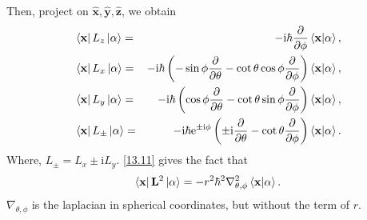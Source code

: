 \documentclass{article}
\theoremstyle{1}
\newcommand{\pa}{\partial}
\newcommand{\ii}{\mathrm{i}}
\newcommand{\ee}{\mathrm{e}}
\begin{document}
Then, project on $\hat{\mathbf{x}},\hat{\mathbf{y}},\hat{\mathbf{z}}$, we obtain
\begin{eqnarray}
    &\bra{\mathbf{x}}L_z\ket{\alpha}=&-\ii \hbar \pdv{\phi}\braket{\mathbf{x}}{\alpha},\\
    &\bra{\mathbf{x}}L_x\ket{\alpha}=&-\ii \hbar \left(-\sin \phi \pdv{\theta}-\cot\theta\cos\phi \pdv{\phi}\right)\braket{\mathbf{x}}{\alpha},\\
    &\bra{\mathbf{x}}L_y\ket{\alpha}=&-\ii \hbar \left(\cos \phi \pdv{\theta}-\cot\theta\sin\phi \pdv{\phi}\right)\braket{\mathbf{x}}{\alpha},\\
    &\bra{\mathbf{x}}L_\pm\ket{\alpha}=&-\ii\hbar \ee^{\pm \ii \phi}\left(\pm \ii\frac{\pa}{\pa \theta}-\cot \theta\frac{\pa}{\pa \phi}\right)\braket{\mathbf{x}}{\alpha}.\label{13.20}
\end{eqnarray}
Where, $L_\pm=L_x\pm \ii L_y$. \eqref{13.11} gives the fact that 
\begin{equation}
    \bra{\mathbf{x}}\mathbf{L}^2\ket{\alpha}=-r^2\hbar^2\nabla^2_{\theta,\phi}\braket{\mathbf{x}}{\alpha}.
\end{equation}
$\nabla_{\theta,\phi}$ is the laplacian in spherical coordinates, but without the term of $r$.
\end{document}
